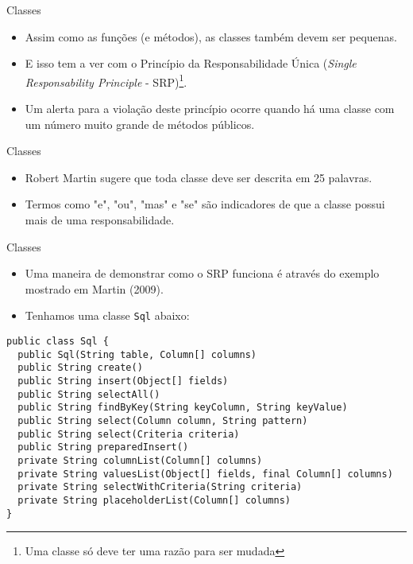 \documentclass[11pt]{beamer}
\begin{document}
  \begin{frame}{Classes}
    \begin{itemize}
      \item Assim como as funções (e métodos), as classes também devem ser pequenas.
      \item E isso tem a ver com o Princípio da Responsabilidade Única (\textit{Single Responsability Principle} - SRP)\footnote{Uma classe só deve ter uma razão para ser mudada}.
      \item Um alerta para a violação deste princípio ocorre quando há uma classe com um número muito grande de métodos públicos.
    \end{itemize}
  \end{frame}

  \begin{frame}{Classes}
    \begin{itemize}
      \item Robert Martin sugere que toda classe deve ser descrita em 25 palavras.
      \item Termos como "e", "ou", "mas" e "se" são indicadores de que a classe possui mais de uma responsabilidade.
    \end{itemize}
  \end{frame}

  \begin{frame}[fragile]{Classes}
    \begin{itemize}
      \item Uma maneira de demonstrar como o SRP funciona é através do exemplo mostrado em Martin (2009).
      \item Tenhamos uma classe \verb|Sql| abaixo:
    \end{itemize}
    \begin{lstlisting}
public class Sql {
  public Sql(String table, Column[] columns)
  public String create()
  public String insert(Object[] fields)
  public String selectAll()
  public String findByKey(String keyColumn, String keyValue)
  public String select(Column column, String pattern)
  public String select(Criteria criteria)
  public String preparedInsert()
  private String columnList(Column[] columns)
  private String valuesList(Object[] fields, final Column[] columns)
  private String selectWithCriteria(String criteria)
  private String placeholderList(Column[] columns)
}
    \end{lstlisting}
  \end{frame}
\end{document}
